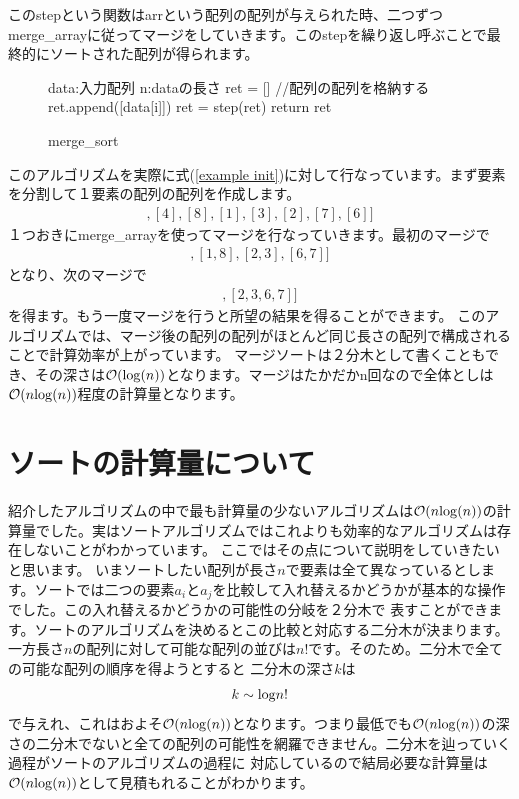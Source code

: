 \documentclass[dvipdfmx,pic,eepic,ecltree]{jarticle}
\begin{document}
このstepという関数はarrという配列の配列が与えられた時、二つずつmerge\_arrayに従ってマージをしていきます。このstepを繰り返し呼ぶことで最終的にソートされた配列が得られます。
\begin{figure}[H]
\begin{algorithm}[H]
	\caption{merge\_sort}
	\label{merge_sort}
	\begin{algorithmic}[1] 
	\STATE data:入力配列
	\STATE n:dataの長さ
	\STATE ret = [] //配列の配列を格納する
	\STATE ret.append([data[i]])
	\ENDFOR
	\STATE ret = step(ret)
	\ENDWHILE
	\STATE return ret
	\end{algorithmic}
\end{algorithm}
\end{figure}
このアルゴリズムを実際に式(\ref{example init})に対して行なっています。まず要素を分割して１要素の配列の配列を作成します。
\begin{eqnarray}
[[5],[4], [8], [1], [3], [2],[7], [6]]
\end{eqnarray}
１つおきにmerge\_arrayを使ってマージを行なっていきます。最初のマージで
\begin{eqnarray}
[[4, 5], [1, 8],[2, 3], [6, 7]]
\end{eqnarray}
となり、次のマージで
\begin{eqnarray}
[[1, 4, 5, 8],[2, 3, 6, 7]]
\end{eqnarray}
を得ます。もう一度マージを行うと所望の結果を得ることができます。
このアルゴリズムでは、マージ後の配列の配列がほとんど同じ長さの配列で構成されることで計算効率が上がっています。
マージソートは２分木として書くこともでき、その深さは$\mathcal{O}({\rm log}(n))$となります。マージはたかだかn回なので全体としは$\mathcal{O}(n{\rm log}(n))$程度の計算量となります。
\section{ソートの計算量について}
紹介したアルゴリズムの中で最も計算量の少ないアルゴリズムは$\mathcal{O}(n{\rm log}(n))$の計算量でした。実はソートアルゴリズムではこれよりも効率的なアルゴリズムは存在しないことがわかっています。
ここではその点について説明をしていきたいと思います。
いまソートしたい配列が長さ$n$で要素は全て異なっているとします。ソートでは二つの要素$a_{i}$と$a_{j}$を比較して入れ替えるかどうかが基本的な操作でした。この入れ替えるかどうかの可能性の分岐を２分木で
表すことができます。ソートのアルゴリズムを決めるとこの比較と対応する二分木が決まります。一方長さ$n$の配列に対して可能な配列の並びは$n!$です。そのため。二分木で全ての可能な配列の順序を得ようとすると
二分木の深さ$k$は
\begin{eqnarray}
k\sim {\rm log}n!
\end{eqnarray}
で与えれ、これはおよそ$\mathcal{O}(n{\rm log}(n))$となります。つまり最低でも$\mathcal{O}(n{\rm log}(n))$の深さの二分木でないと全ての配列の可能性を網羅できません。二分木を辿っていく過程がソートのアルゴリズムの過程に
対応しているので結局必要な計算量は$\mathcal{O}(n{\rm log}(n))$として見積もれることがわかります。
\end{document}
